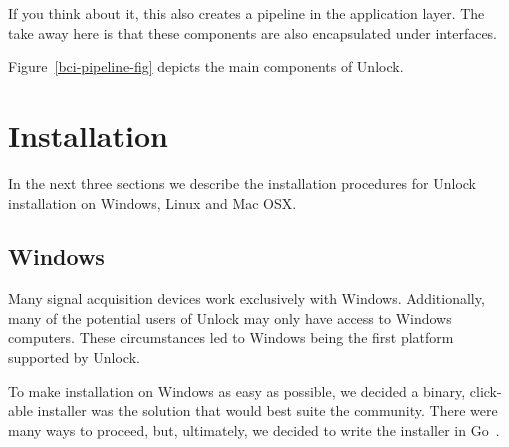 \documentclass[11pt]{article}
\begin{document}
If you think about it, this also creates a pipeline in the application layer.  The take away here is that these components are also encapsulated under interfaces.

Figure~\ref{bci-pipeline-fig} depicts the main components of Unlock.




\section{Installation}

In the next three sections we describe the installation procedures for Unlock installation on Windows, Linux and Mac OSX.  

\subsection{Windows}

Many signal acquisition devices work exclusively with Windows.  Additionally, many of the potential users of Unlock may only have access to Windows computers.  These circumstances led to Windows being the first platform supported by Unlock.

To make installation on Windows as easy as possible, we decided a binary, click-able installer was the solution that would best suite the community.  There were many ways to proceed, but, ultimately, we decided to write the installer in Go~\cite{golang}.  
\end{document}
